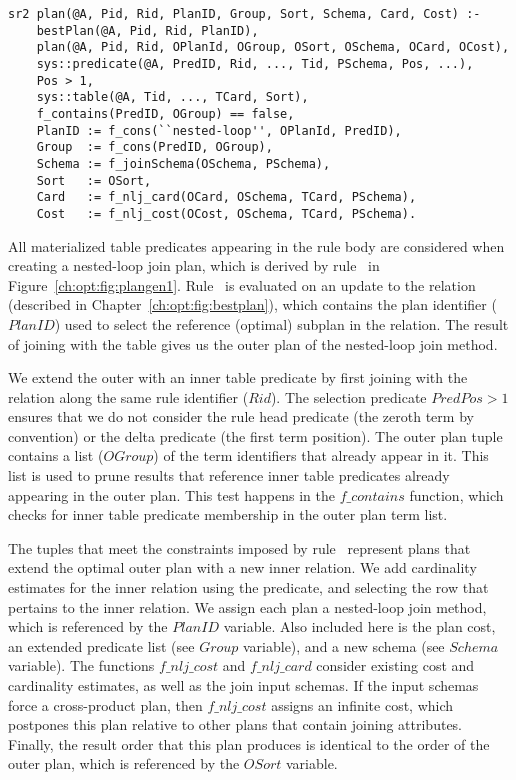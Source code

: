\begin{figure*}
\ssp
\centering
\begin{lstlisting}
sr2 plan(@A, Pid, Rid, PlanID, Group, Sort, Schema, Card, Cost) :- 
    bestPlan(@A, Pid, Rid, PlanID),
    plan(@A, Pid, Rid, OPlanId, OGroup, OSort, OSchema, OCard, OCost),
    sys::predicate(@A, PredID, Rid, ..., Tid, PSchema, Pos, ...),
    Pos > 1,
    sys::table(@A, Tid, ..., TCard, Sort),
    f_contains(PredID, OGroup) == false,
    PlanID := f_cons(``nested-loop'', OPlanId, PredID),
    Group  := f_cons(PredID, OGroup),
    Schema := f_joinSchema(OSchema, PSchema),
    Sort   := OSort,
    Card   := f_nlj_card(OCard, OSchema, TCard, PSchema),
    Cost   := f_nlj_cost(OCost, OSchema, TCard, PSchema).
\end{lstlisting}
\caption{\label{ch:opt:fig:plangen1}nested-loop join method.}
\end{figure*}

All materialized table predicates appearing in the rule body are considered when
creating a nested-loop join plan, which is derived by rule~ in
Figure~\ref{ch:opt:fig:plangen1}.  Rule~ is evaluated on an update to the
 relation (described in Chapter~\ref{ch:opt:fig:bestplan}), which
contains the plan identifier ($PlanID$) used to select the reference (optimal)
subplan in the  relation.  The result of joining  with 
the  table gives us the outer plan of the nested-loop join method.

We extend the outer  with an inner table predicate by first joining
with the  relation along the same rule identifier ($Rid$).
The selection predicate $PredPos > 1$ ensures that we do not consider the rule
head predicate (the zeroth term by convention) or the delta predicate (the
first term position).  The outer plan tuple contains a list ($OGroup$) of the
term identifiers that already appear in it.  This list is used to prune results
that reference inner table predicates already appearing in the outer plan.
This test happens in the $f\_contains$ function, which checks for inner table
predicate membership in the outer plan term list.

The tuples that meet the constraints imposed by rule~ represent plans
that extend the optimal outer plan with a new inner relation.  We add
cardinality estimates for the inner relation using the 
predicate, and selecting the row that pertains to the inner relation.  We
assign each plan a nested-loop join method, which is referenced by the $PlanID$
variable.  Also included here is the plan cost, an extended predicate list (see
$Group$ variable), and a new schema (see $Schema$ variable).  The functions
$f\_nlj\_cost$ and $f\_nlj\_card$ consider existing cost and cardinality
estimates, as well as the join input schemas.  If the input schemas force a
cross-product plan, then $f\_nlj\_cost$ assigns an infinite cost, which
postpones this plan relative to other plans that contain joining attributes.
Finally, the result order that this plan produces is identical to the order of
the outer plan, which is referenced by the $OSort$ variable.

